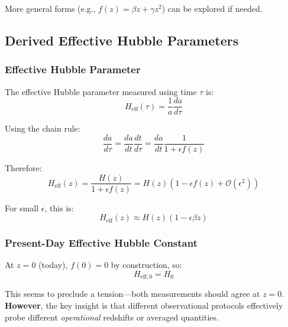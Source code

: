 More general forms (e.g., $f(z) = \beta z + \gamma z^2$) can be explored if needed.

\subsection{Derived Effective Hubble Parameters}

\subsubsection{Effective Hubble Parameter}

The effective Hubble parameter measured using time $\tau$ is:
\begin{equation}
H_{\text{eff}}(\tau) = \frac{1}{a} \frac{da}{d\tau}
\label{eq:hubble_eff}
\end{equation}

Using the chain rule:
\begin{equation}
\frac{da}{d\tau} = \frac{da}{dt} \frac{dt}{d\tau} = \frac{da}{dt} \frac{1}{1 + \epsilon f(z)}
\label{eq:chain_rule}
\end{equation}

Therefore:
\begin{equation}
H_{\text{eff}}(z) = \frac{H(z)}{1 + \epsilon f(z)} = H(z) (1 - \epsilon f(z) + \mathcal{O}(\epsilon^2))
\label{eq:heff_general}
\end{equation}

For small $\epsilon$, this is:
\begin{equation}
H_{\text{eff}}(z) \approx H(z) (1 - \epsilon \beta z)
\label{eq:heff_linear}
\end{equation}

\subsubsection{Present-Day Effective Hubble Constant}

At $z=0$ (today), $f(0) = 0$ by construction, so:
\begin{equation}
H_{\text{eff},0} = H_0
\label{eq:heff_today}
\end{equation}

This seems to preclude a tension—both measurements should agree at $z=0$. \textbf{However}, the key insight is that different observational protocols effectively probe different \textit{operational} redshifts or averaged quantities.

